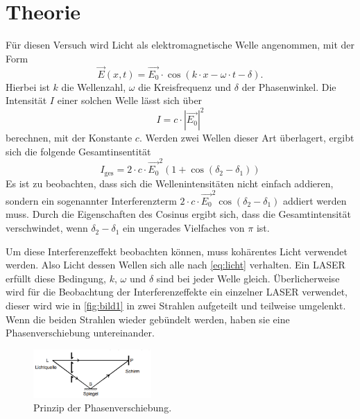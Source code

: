 \section{Theorie}
\label{sec:Theorie}



 
Für diesen Versuch wird Licht als elektromagnetische Welle angenommen, mit der Form 
\begin{equation}
    \vec{E}(x,t) = \vec{E_0} \cdot \cos{\left(k \cdot x - \omega \cdot t - \delta\right)}.
    \label{eq:licht}
\end{equation}
Hierbei ist $k$ die Wellenzahl, $\omega$ die Kreisfrequenz und $\delta$ der Phasenwinkel.
Die Intensität $I$ einer solchen Welle lässt sich über 
\begin{equation}
    I = c \cdot |\vec{E_0}|^2
\end{equation}
berechnen, mit der Konstante $c$.
Werden zwei Wellen dieser Art überlagert, ergibt sich die folgende Gesamtinsentität
\begin{equation}
    I_\text{ges} = 2\cdot c \cdot \vec{E_0}^2 \left(1 + \cos{(\delta_2 - \delta_1)}\right)
\end{equation}
Es ist zu beobachten, dass sich die Wellenintensitäten nicht einfach addieren, sondern ein sogenannter Interferenzterm $2\cdot c \cdot \vec{E_0}^2\cos{(\delta_2 - \delta_1)}$ addiert werden muss.
Durch die Eigenschaften des Cosinus ergibt sich, dass die Gesamtintensität verschwindet, wenn $\delta_2 - \delta_1$ ein ungerades Vielfaches von $\pi$ ist.

Um diese Interferenzeffekt beobachten können, muss kohärentes Licht verwendet werden.
Also Licht dessen Wellen sich alle nach \autoref{eq:licht} verhalten. 
Ein LASER erfüllt diese Bedingung, $k$, $\omega$ und $\delta$ sind bei jeder Welle gleich. 
Überlicherweise wird für die Beobachtung der Interferenzeffekte ein einzelner LASER verwendet, dieser wird wie in \autoref{fig:bild1} in zwei Strahlen aufgeteilt und teilweise umgelenkt.
Wenn die beiden Strahlen wieder gebündelt werden, haben sie eine Phasenverschiebung untereinander.

\begin{figure}
    \centering
    \includegraphics[width=0.4\textwidth]{images/bild1.png}
    \caption{Prinzip der Phasenverschiebung.\cite{V401}}
    \label{fig:bild1}
\end{figure}


